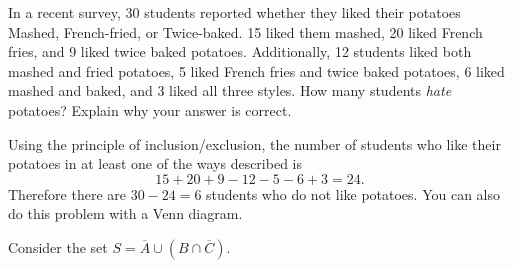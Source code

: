 \documentclass[11pt]{exam}
\def\circleA{(-.5,0) circle (1)}
\def\circleAlabel{(-1.5,.6) node[above]{$A$}}
\def\circleB{(.5,0) circle (1)}
\def\circleBlabel{(1.5,.6) node[above]{$B$}}
\def\circleC{(0,-1) circle (1)}
\def\circleClabel{(.5,-2) node[right]{$C$}}
\def\threesetbox{(-2,-2.5) rectangle (2,1.5)}
\def\bar{\overline}
\begin{document}
\begin{questions}
\question[4] In a recent survey, 30 students reported whether they liked their potatoes Mashed, French-fried, or Twice-baked. 15 liked them mashed, 20 liked French fries, and 9 liked twice baked potatoes. Additionally, 12 students liked both mashed and fried potatoes, 5 liked French fries and twice baked potatoes, 6 liked mashed and baked, and 3 liked all three styles. How many students
{\em hate} potatoes?  Explain why your answer is correct.

\begin{solution}
  Using the principle of inclusion/exclusion, the number of students who like their potatoes in at least one of the ways described is \[15 + 20 + 9 - 12 - 5 - 6 + 3 = 24.\]  Therefore there are $30-24 = 6$ students who do not like potatoes.  You can also do this problem with a Venn diagram.
\end{solution}

\question[6] Consider the set $S = \bar A \cup (B \cap \bar C)$.
\end{questions}
\end{document}
